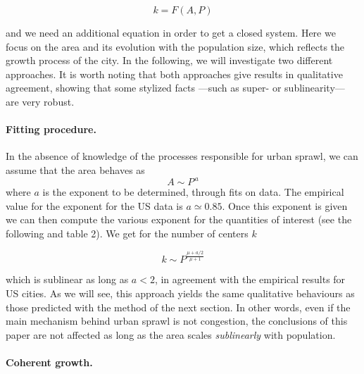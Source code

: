 \begin{equation}
k = F\left(A,P\right)
\end{equation}

and we need an additional equation in order to get a closed system. Here we focus on the area and its evolution with the population size, which reflects the growth process of the city. In the following, we will investigate two different approaches. It is worth noting that both approaches give results in qualitative agreement, showing that some stylized facts ---such as super- or sublinearity--- are very robust.\\ 

\paragraph{Fitting procedure.}

In the absence of knowledge of the processes responsible for urban sprawl, we can assume that the area behaves as 
\begin{equation}
A \sim P^{\,a}
\label{eq:fit}
\end{equation}
where $a$ is the exponent to be determined, through fits on data. The empirical value for the exponent for the US data is $a\simeq 0.85$. Once this exponent is given we can then compute the various exponent for the quantities of interest (see the following and table 2). We get for the number of centers $k$

\begin{equation}
k \sim P^{\frac{\mu + a/2}{\mu+1}}
\end{equation}

which is sublinear as long as $a<2$, in agreement with the empirical results for US cities. As we will see, this approach yields the same qualitative behaviours as those predicted with the method of the next section. In other words, even if the main mechanism behind urban sprawl is not congestion, the conclusions of this paper are not affected as long as the area scales \emph{sublinearly} with population.\\


\paragraph{Coherent growth.}

